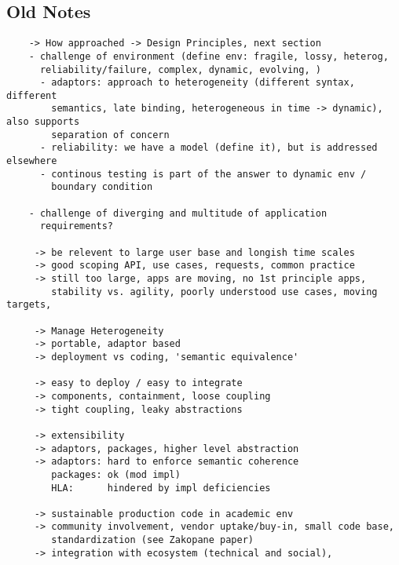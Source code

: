 \documentclass[a4paper,12pt]{article}
\newcommand{\jhanote}[1]{  {\textcolor{red}  { ***Shantenu: #1 }}}
\newcommand{\jhanote}[1]{}
\begin{document}
    







\subsection*{Old Notes}

\begin{verbatim}
    -> How approached -> Design Principles, next section
    - challenge of environment (define env: fragile, lossy, heterog,
      reliability/failure, complex, dynamic, evolving, ) 
      - adaptors: approach to heterogeneity (different syntax, different
        semantics, late binding, heterogeneous in time -> dynamic), also supports 
        separation of concern
      - reliability: we have a model (define it), but is addressed elsewhere
      - continous testing is part of the answer to dynamic env /
        boundary condition

    - challenge of diverging and multitude of application
      requirements?

     -> be relevent to large user base and longish time scales
     -> good scoping API, use cases, requests, common practice
     -> still too large, apps are moving, no 1st principle apps,
        stability vs. agility, poorly understood use cases, moving targets, 

     -> Manage Heterogeneity
     -> portable, adaptor based
     -> deployment vs coding, 'semantic equivalence'
  
     -> easy to deploy / easy to integrate
     -> components, containment, loose coupling
     -> tight coupling, leaky abstractions
  
     -> extensibility
     -> adaptors, packages, higher level abstraction
     -> adaptors: hard to enforce semantic coherence
        packages: ok (mod impl)
        HLA:      hindered by impl deficiencies
  
     -> sustainable production code in academic env
     -> community involvement, vendor uptake/buy-in, small code base,
        standardization (see Zakopane paper)
     -> integration with ecosystem (technical and social), 
   \end{verbatim}
\end{document}
